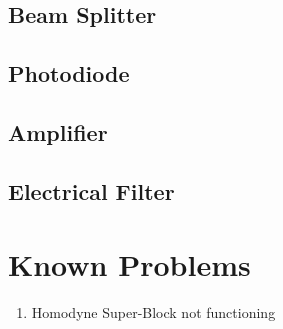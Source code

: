\documentclass[a4paper]{article}
\begin{document}
\subsection{Beam Splitter}


\subsection{Photodiode}


\subsection{Amplifier}


\subsection{Electrical Filter}


\section{Known Problems}
\begin{enumerate}
    \item Homodyne Super-Block not functioning
\end{enumerate}


%
%
\end{document}
